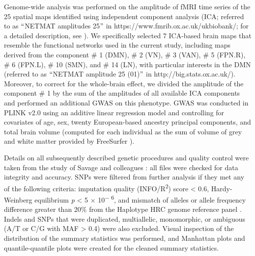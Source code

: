 \begin{refsection}
Genome-wide analysis was performed on the amplitude of fMRI time series of the 25 spatial maps identified using independent component analysis (ICA; referred to as $``$NETMAT amplitudes 25$"$  in https://www.fmrib.ox.ac.uk/ukbiobank/; for a detailed description, see \citep{elliott2018genome,Miller2016MultimodalPB}). We specifically selected 7 ICA-based brain maps that resemble the functional networks used in the current study, including maps derived from the component $\#$ 1 (DMN), $\#$ 2 (VN), $\#$ 3 (VAN), $\#$ 5 (FPN.R), $\#$ 6 (FPN.L), $\#$ 10 (SMN), and $\#$ 14 (LN), with particular interests in the DMN (referred to as $``$NETMAT amplitude 25 (01)$"$  in http://big.stats.ox.ac.uk/). Moreover, to correct for the whole-brain effect, we divided the amplitude of the component $\#$ 1 by the sum of the amplitudes of all available ICA components and performed an additional GWAS on this phenotype. GWAS was conducted in PLINK v2.0 \citep{Purcell2007PLINKAT} using an additive linear regression model and controlling for covariates of age, sex, twenty European-based ancestry principal components, and total brain volume (computed for each individual as the sum of volume of grey and white matter provided by FreeSurfer \citep{FISCHL2012Freesurfer}).

Details on all subsequently described genetic procedures and quality control were taken from the study of Savage and colleagues \citep{Savage2018GenomewideAM}: all files were checked for data integrity and accuracy. SNPs were filtered from further analysis if they met any of the following criteria: imputation quality (INFO/R\textsuperscript{2}) score < 0.6, Hardy-Weinberg equilibrium \textit{p} < 5 $ \times $  10\textsuperscript{$-$ 6}, and mismatch of alleles or allele frequency difference greater than 20$\%$  from the Haplotype HRC genome reference panel \citep{McCarthy2016ARP}. Indels and SNPs that were duplicated, multiallelic, monomorphic, or ambiguous (A/T or C/G with MAF > 0.4) were also excluded. Visual inspection of the distribution of the summary statistics was performed, and Manhattan plots and quantile-quantile plots were created for the cleaned summary statistics.\\


\end{refsection}
